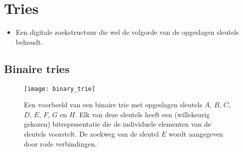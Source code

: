 \section{Tries}
\begin{itemize}
    \item Een digitale zoekstructuur die wel de volgorde van de opgeslagen sleutels behoudt.
\end{itemize}

\subsection{Binaire tries}

\begin{figure}[ht]
    \centering
    \texttt{[image: binary\_trie]}
    \caption{Een voorbeeld van een binaire trie met opgeslagen sleutels $A$, $B$, $C$, $D$, $E$, $F$, $G$ en $H$. Elk van deze sleutels heeft een (willekeurig gekozen) bitrepresentatie die de individuele elementen van de sleutels voorstelt. De zoekweg van de sleutel $E$ wordt aangegeven door rode verbindingen.}
    \label{fig:binary_trie}
\end{figure}

